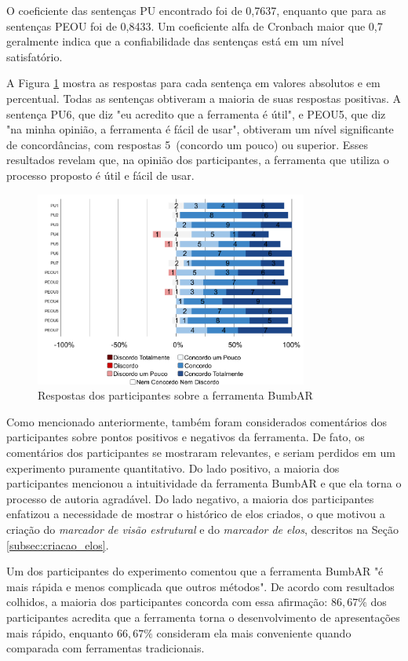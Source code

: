 \documentclass[../main.tex]{subfiles}
\begin{document}
O coeficiente das sentenças PU encontrado foi de 0,7637, enquanto que para as sentenças PEOU foi de 0,8433. Um coeficiente alfa de Cronbach maior que 0,7 geralmente indica que a confiabilidade das sentenças está em um nível satisfatório. 

A Figura \ref{fig:resultados} mostra as respostas para cada sentença em valores absolutos e em percentual. Todas as sentenças obtiveram a maioria de suas respostas positivas. A sentença PU6, que diz "eu acredito que a ferramenta é útil", e PEOU5, que diz "na minha opinião, a ferramenta é fácil de usar", obtiveram um nível significante de concordâncias, com respostas 5~(concordo um pouco) ou superior. Esses resultados revelam que, na opinião dos participantes, a ferramenta que utiliza o processo proposto é útil e fácil de usar.

\begin{figure}[ht!]
\centering
\includegraphics[width=0.8\textwidth]{IMG/Avaliacao/resultados_bumbar.png}
\caption{Respostas dos participantes sobre a ferramenta BumbAR}
\label{fig:resultados}
\end{figure}

Como mencionado anteriormente, também foram considerados comentários dos participantes sobre pontos positivos e negativos da ferramenta. De fato, os comentários dos participantes se mostraram relevantes, e seriam perdidos em um experimento puramente quantitativo. Do lado positivo, a maioria dos participantes mencionou a intuitividade da ferramenta BumbAR e que ela torna o processo de autoria agradável. Do lado negativo, a maioria dos participantes enfatizou a necessidade de mostrar o histórico de elos criados, o que motivou a criação do \emph{marcador de visão estrutural} e do \emph{marcador de elos}, descritos na Seção \ref{subsec:criacao_elos}.

Um dos participantes do experimento comentou que a ferramenta BumbAR "é mais rápida e menos complicada que outros métodos". De acordo com resultados colhidos, a maioria dos participantes concorda com essa afirmação: $86,67\%$ dos participantes acredita que a ferramenta torna o desenvolvimento de apresentações mais rápido, enquanto $66,67\%$ consideram ela mais conveniente quando comparada com ferramentas tradicionais.
\end{document}
